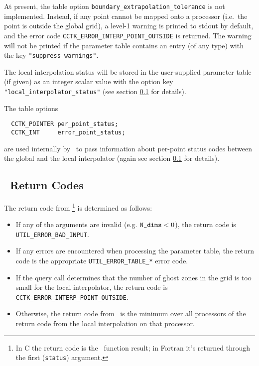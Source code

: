 \documentclass{article}
\begin{document}
At present, the table option \verb|boundary_extrapolation_tolerance| is not
implemented. Instead, if any point cannot be mapped onto a processor
(i.e.\  the point is outside the global grid), a level-1 warning is printed to
stdout by default, and the error code \verb|CCTK_ERROR_INTERP_POINT_OUTSIDE| is
returned. The warning will not be printed if the parameter table contains an
entry (of any type) with the key \verb|"suppress_warnings"|.

The local interpolation status will be stored in the user-supplied parameter
table (if given) as an integer scalar value with the option key
\verb|"local_interpolator_status"| (see section \ref{PUGHInterp_return_codes} for details).

The table options
\begin{verbatim}
  CCTK_POINTER per_point_status;
  CCTK_INT     error_point_status;
\end{verbatim}
are used internally by \InterpGridArrays\ to pass information
about per-point status codes between the global and the local interpolator
(again see section \ref{PUGHInterp_return_codes} for details).


\subsection{\InterpGridArrays\ Return Codes}
\label{PUGHInterp_return_codes}

The return code from \InterpGridArrays%
\footnote{%
	 In C the return code is the \InterpGridArrays\
	 function result; in Fortran it's returned through
	 the first ({\tt status}) argument.%
	 }%
is determined as follows:
\begin{itemize}
\item	If any of the arguments are invalid (e.g. $\verb|N_dims| < 0$),
	the return code is \verb|UTIL_ERROR_BAD_INPUT|.
\item	If any errors are encountered when processing the
	parameter table, the return code is the
	appropriate \verb|UTIL_ERROR_TABLE_*| error code.
\item	If the query call determines that
	the number of ghost zones in the grid is too small
	for the local interpolator, the return code is
	\verb|CCTK_ERROR_INTERP_POINT_OUTSIDE|.
\item	Otherwise, the return code from \InterpGridArrays\ is
	the minimum over all processors of the return code
	from the local interpolation on that processor.
\end{itemize}
\end{document}
